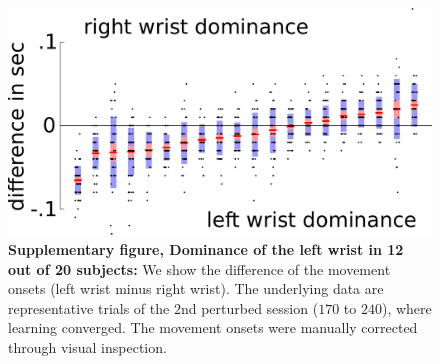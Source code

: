 

\begin{figure}
\centering
\includegraphics[width=.6\textwidth]{Elmar/picsSupp/SubFigWristPriorities}
 \caption{\textbf{Supplementary figure, Dominance of the left wrist in 12 out of 20 subjects:} We show the difference of the movement onsets (left wrist minus right wrist). 
 The underlying data are representative trials of the $2$nd perturbed session ($170$ to $240$), where learning converged. The movement onsets were manually corrected through visual inspection. 
 }
\label{fig:subFigWristPriorities}
\end{figure}

